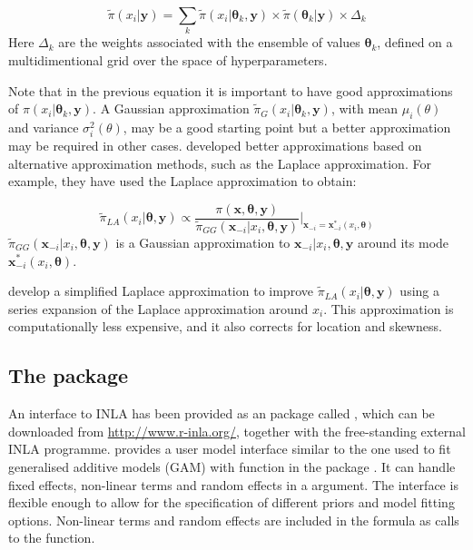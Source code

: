 \documentclass[article]{jss}
\begin{document}
\begin{equation}
\tilde\pi(x_i|\mathbf{y})= 
\sum_k \tilde\pi (x_i|\mathbf{\theta}_k, \mathbf{y})\times 
\tilde\pi(\mathbf{\theta}_k|\mathbf{y})\times \Delta_k
\end{equation}
\noindent
Here $\Delta_k$ are the weights associated with the ensemble of values
$\mathbf{\theta}_k$, defined on a multidimentional grid over
the space of hyperparameters.


Note that in the previous equation it is important to have good approximations
of $\pi (x_i|\mathbf{\theta}_k, \mathbf{y})$. A Gaussian approximation
$\tilde\pi_G (x_i|\mathbf{\theta}_k, \mathbf{y})$, with mean $\mu_i(\theta)$
and variance $\sigma^2_i(\theta)$, may be a good starting point but a better
approximation may be required in other cases. \citet{isi:000264374200002}
developed better approximations based on alternative approximation methods,
such as the Laplace approximation.  For example, they have used the Laplace
approximation to obtain:

\begin{equation}
\tilde\pi_{LA}(x_i|\mathbf{\theta}, \mathbf{y}) \propto 
\frac{\pi(\mathbf{x}, \mathbf{\theta}, \mathbf{y})}
{\tilde\pi_{GG}(\mathbf{x}_{-i}|x_i, \mathbf{\theta}, \mathbf{y})}
\bigg|_{\mathbf{x}_{-i}=\mathbf{x}^*_{-i}(x_i, \mathbf{\theta})}
\end{equation}
\noindent
$\tilde\pi_{GG}(\mathbf{x}_{-i}|x_i, \mathbf{\theta}, \mathbf{y})$ is a
Gaussian  approximation to $\mathbf{x}_{-i}|x_i, \mathbf{\theta}, \mathbf{y}$
around its mode $\mathbf{x}^*_{-i}(x_i, \mathbf{\theta})$.

\citet{isi:000264374200002} develop a simplified Laplace approximation to
improve $\tilde\pi_{LA}(x_i|\mathbf{\theta}, \mathbf{y})$ using a series
expansion of the Laplace approximation around $x_i$. This approximation is
computationally less expensive, and it also corrects for location and
skewness.


\subsection[The R-INLA package]{The  package}

An interface to INLA has been provided as an  package called ,
which can be downloaded from \url{http://www.r-inla.org/}, together with the free-standing external INLA programme. 
provides a user model interface similar to the one used to fit generalised additive
models (GAM) with function  in the  package \citep{Wood:2006}. %
It can handle fixed effects, non-linear terms
and random effects in a  argument. The interface is flexible
enough to allow for the specification of different priors and model fitting
options. Non-linear terms and random effects are included in the formula as
calls to the  function. 
\end{document}
